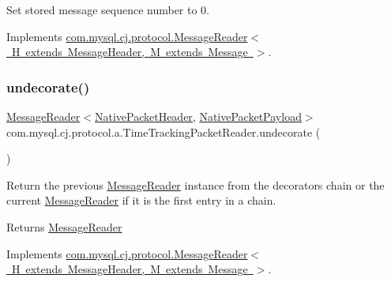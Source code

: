 Set stored message sequence number to 0. 

Implements \mbox{\hyperlink{interfacecom_1_1mysql_1_1cj_1_1protocol_1_1_message_reader_a3161e55ab8c1bb4d533aa6d2700fb14d}{com.\+mysql.\+cj.\+protocol.\+Message\+Reader$<$ H extends Message\+Header, M extends Message $>$}}.

\mbox{\label{classcom_1_1mysql_1_1cj_1_1protocol_1_1a_1_1_time_tracking_packet_reader_aebbbca667b7f55074795c128c2aff259}} 
\subsubsection{\texorpdfstring{undecorate()}{undecorate()}}
{\footnotesize\ttfamily \mbox{\hyperlink{interfacecom_1_1mysql_1_1cj_1_1protocol_1_1_message_reader}{Message\+Reader}}$<$\mbox{\hyperlink{classcom_1_1mysql_1_1cj_1_1protocol_1_1a_1_1_native_packet_header}{Native\+Packet\+Header}}, \mbox{\hyperlink{classcom_1_1mysql_1_1cj_1_1protocol_1_1a_1_1_native_packet_payload}{Native\+Packet\+Payload}}$>$ com.\+mysql.\+cj.\+protocol.\+a.\+Time\+Tracking\+Packet\+Reader.\+undecorate (\begin{DoxyParamCaption}{ }\end{DoxyParamCaption})}

Return the previous \mbox{\hyperlink{interfacecom_1_1mysql_1_1cj_1_1protocol_1_1_message_reader}{Message\+Reader}} instance from the decorators chain or the current \mbox{\hyperlink{interfacecom_1_1mysql_1_1cj_1_1protocol_1_1_message_reader}{Message\+Reader}} if it is the first entry in a chain.

\begin{DoxyReturn}{Returns}
\mbox{\hyperlink{interfacecom_1_1mysql_1_1cj_1_1protocol_1_1_message_reader}{Message\+Reader}} 
\end{DoxyReturn}


Implements \mbox{\hyperlink{interfacecom_1_1mysql_1_1cj_1_1protocol_1_1_message_reader_a59b0e118857c167ad4a270845f19e89b}{com.\+mysql.\+cj.\+protocol.\+Message\+Reader$<$ H extends Message\+Header, M extends Message $>$}}.

